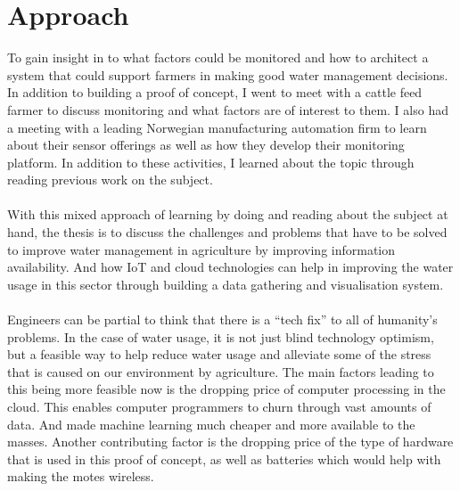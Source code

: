 \documentclass[]{uiophd}
\begin{document}
\section{Approach}
To gain insight in to what factors could be monitored and how to architect a system that could support farmers in making good water management decisions. In addition to building a proof of concept, I went to meet with a cattle feed farmer to discuss monitoring and what factors are of interest to them. I also had a meeting with a leading Norwegian manufacturing automation firm to learn about their sensor offerings as well as how they develop their monitoring platform. In addition to these activities, I learned about the topic through reading previous work on the subject.
\\\\
With this mixed approach of learning by doing and reading about the subject at hand, the thesis is to discuss the challenges and problems that have to be solved to improve water management in agriculture by improving information availability. And how IoT and cloud technologies can help in improving the water usage in this sector through building a data gathering and visualisation system.
\\\\
Engineers can be partial to think that there is a “tech fix” to all of humanity's problems. In the case of water usage, it is not just blind technology optimism, but a feasible way to help reduce water usage and alleviate some of the stress that is caused on our environment by agriculture. The main factors leading to this being more feasible now is the dropping price of computer processing in the cloud. This enables computer programmers to churn through vast amounts of data. And made machine learning much cheaper and more available to the masses. Another contributing factor is the dropping price of the type of hardware that is used in this proof of concept, as well as batteries which would help with making the motes wireless.
\end{document}
